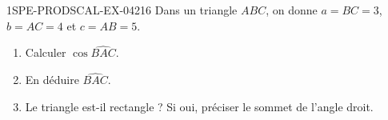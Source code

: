 \begin{exercice}{1SPE-PRODSCAL-EX-042}{1}{6}
Dans un triangle $ABC$, on donne $a = BC = 3$, $b = AC = 4$ et $c = AB = 5$.
\begin{enumerate}
  \item Calculer $\cos\widehat{BAC}$.
  \item En déduire $\widehat{BAC}$.
  \item Le triangle est-il rectangle ? Si oui, préciser le sommet de l'angle droit.
\end{enumerate}
\end{exercice}
